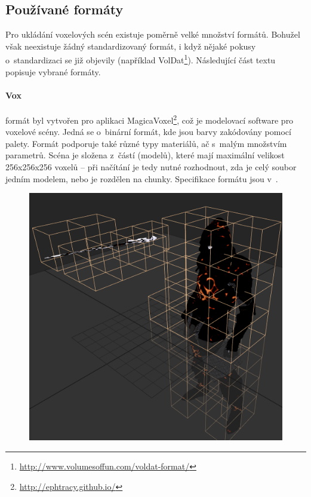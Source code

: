 \subsection{Používané formáty} \label{sec:format}
Pro ukládání voxelových scén existuje poměrně velké množství formátů. Bohužel však neexistuje žádný standardizovaný formát, i když nějaké pokusy o~standardizaci se již objevily (například VolDat\footnote{\url{http://www.volumesoffun.com/voldat-format/}}). Následující část textu popisuje vybrané formáty.

\paragraph{Vox} formát byl vytvořen pro aplikaci MagicaVoxel\footnote{\url{http://ephtracy.github.io/}}, což je modelovací software pro voxelové scény. Jedná se o~binární formát, kde jsou barvy zakódovány pomocí palety. Formát podporuje také různé typy materiálů, ač s~malým množstvím parametrů. Scéna je složena z~částí (modelů), které mají maximální velikost 256x256x256 voxelů -- při načítání je tedy nutné rozhodnout, zda je celý soubor jedním modelem, nebo je rozdělen na chunky. Specifikace formátu jsou v~\cite{vox_format}.

\begin{figure}[H]
	\centering
	\includegraphics[scale=0.5]{images/magica_voxel_vox.png}
	\captionsetup{justification=centering}
	\label{fig:magica_vox}
\end{figure}

